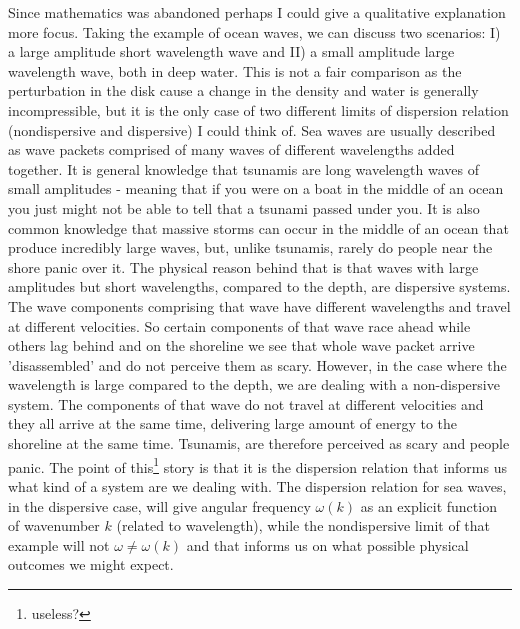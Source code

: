 \documentclass[12pt]{article}
\begin{document}
Since mathematics was abandoned perhaps I could give a qualitative explanation more focus. Taking the example of ocean waves, we can discuss two scenarios: I) a large amplitude short wavelength wave and II) a small amplitude large wavelength wave, both in deep water. This is not a fair comparison as the perturbation in the disk cause a change in the density and water is generally incompressible, but it is the only case of two different limits of dispersion relation (nondispersive and dispersive) I could think of. Sea waves are usually described as wave packets comprised of many waves of different wavelengths added together. It is general knowledge that tsunamis are long wavelength waves of small amplitudes - meaning that if you were on a boat in the middle of an ocean you just might not be able to tell that a tsunami passed under you. It is also common knowledge that massive storms can occur in the middle of an ocean that produce incredibly large waves, but, unlike tsunamis, rarely do people near the shore panic over it. The physical reason behind that is that waves with large amplitudes but short wavelengths, compared to the depth, are dispersive systems. The wave components comprising that wave have different wavelengths and travel at different velocities. So certain components of that wave race ahead while others lag behind and on the shoreline we see that whole wave packet arrive 'disassembled' and do not perceive them as scary. However, in the case where the wavelength is large compared to the depth, we are dealing with a non-dispersive system. The components of that wave do not travel at different velocities and they all arrive at the same time, delivering large amount of energy to the shoreline at the same time. Tsunamis, are therefore perceived as scary and people panic. The point of this\footnote{useless?} story is that it is the dispersion relation that informs us what kind of a system are we dealing with. The dispersion relation for sea waves, in the dispersive case, will give angular frequency $\omega(k)$ as an explicit function of wavenumber $k$ (related to wavelength), while the nondispersive limit of that example will not $\omega\ne\omega(k)$ and that informs us on what possible physical outcomes we might expect.
\end{document}
